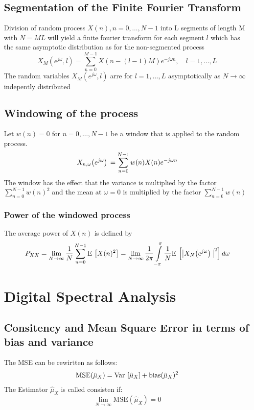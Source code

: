 \documentclass[accentcolor=tud4c,9.5pt,nochapname,bigchapter,paper=a5report]{tudreport}
\begin{document}
\section{Segmentation of the Finite Fourier Transform}
Division of random process $X(n), n=0,\ldots,N-1$ into L segments of length M with $N=ML$ will yield a finite fourier transform
for each segment $l$ which has the same asymptotic distribution as for the non-segmented process 
\begin{equation}
X_M(e^{j\omega},l)=\sum\limits_{n=0}^{M-1}X(n-(l-1)M)e^{-j\omega n}, \quad l=1,\ldots,L
\end{equation}
The random variables $X_M(e^{j\omega},l)$ arre for $l=1,\ldots,L$ asymptotically as $N\rightarrow\infty$ indepently distributed

\section{Windowing of the process}
Let $w(n)=0$ for $n=0,\ldots,N-1$ be a window that is applied to the random process.
\begin{equation}
X_{n,\omega} {\left(e^{j\omega}\right)}\,=\sum\limits_{n=0}^{N-1} w(n)X(n)e^{-j\omega n}
\end{equation}
The window has the effect that the variance is multiplied by the factor $\sum_{n=0}^{N-1}w(n)^2$
and the mean at $\omega=0$ is multiplied by the factor $\sum_{n=0}^{N-1} w(n)$

\subsection{Power of the windowed process}
The average power of $X(n)$ is defined by
\begin{equation}
P_{XX}=\lim\limits_{N\rightarrow\infty}\frac{1}{N}\sum\limits_{n=0}^{N-1}{\rm E}\,\left[X(n)^2\right] =
\lim\limits_{N\rightarrow\infty}\frac{1}{2\pi}\int\limits_{-\pi}^{\pi}\frac{1}{N}{\rm E}\,\left[\left|X_N{\left(e^{j\omega}\right)}\,\right|^2\right] d\omega
\end{equation}

\chapter{Digital Spectral Analysis}
\section{Consitency and Mean Square Error in terms of bias and variance}
The MSE can be rewirtten as follows:
\begin{equation}
\text{MSE}(\hat{\mu}_X)={\rm Var}\, \left[\hat{\mu}_X\right] + \text{bias}(\hat{\mu}_X)^2
\end{equation}
The Estimator $\hat{\mu}_X$ is called consisten if:
\begin{equation}
\lim\limits_{N\rightarrow\infty} \text{MSE}(\hat{\mu}_X) = 0
\end{equation}
\end{document}
